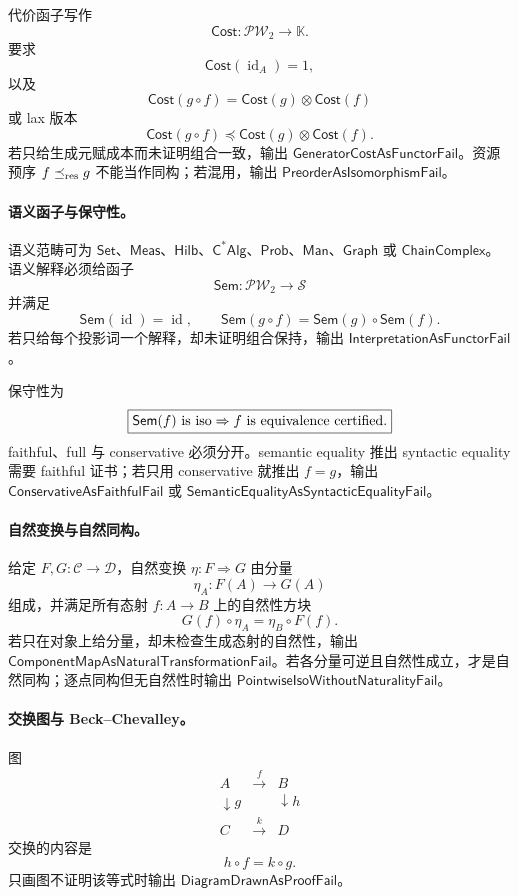 代价函子写作
\[
\boxed{
\mathsf{Cost}:\mathcal{PW}_2\to\mathbb K.
}
\]
要求
\[
\mathsf{Cost}(\operatorname{id}_A)=1,
\]
以及
\[
\mathsf{Cost}(g\circ f)=\mathsf{Cost}(g)\otimes\mathsf{Cost}(f)
\]
或 lax 版本
\[
\mathsf{Cost}(g\circ f)\preceq
\mathsf{Cost}(g)\otimes\mathsf{Cost}(f).
\]
若只给生成元赋成本而未证明组合一致，输出 \(\mathsf{GeneratorCostAsFunctorFail}\)。资源预序 \(f\preceq_{\rm res}g\) 不能当作同构；若混用，输出 \(\mathsf{PreorderAsIsomorphismFail}\)。

\paragraph{语义函子与保守性。}
语义范畴可为 \(\mathsf{Set}\)、\(\mathsf{Meas}\)、\(\mathsf{Hilb}\)、\(\mathsf{C^*Alg}\)、\(\mathsf{Prob}\)、\(\mathsf{Man}\)、\(\mathsf{Graph}\) 或 \(\mathsf{ChainComplex}\)。语义解释必须给函子
\[
\boxed{
\mathsf{Sem}:\mathcal{PW}_2\to\mathcal S
}
\]
并满足
\[
\mathsf{Sem}(\operatorname{id})=\operatorname{id},
\qquad
\mathsf{Sem}(g\circ f)=\mathsf{Sem}(g)\circ\mathsf{Sem}(f).
\]
若只给每个投影词一个解释，却未证明组合保持，输出 \(\mathsf{InterpretationAsFunctorFail}\)。

保守性为
\[
\boxed{
\mathsf{Sem}(f)\ {\rm is\ iso}
\Rightarrow
f\ {\rm is\ equivalence\ certified}.
}
\]
faithful、full 与 conservative 必须分开。semantic equality 推出 syntactic equality 需要 faithful 证书；若只用 conservative 就推出 \(f=g\)，输出 \(\mathsf{ConservativeAsFaithfulFail}\) 或 \(\mathsf{SemanticEqualityAsSyntacticEqualityFail}\)。

\paragraph{自然变换与自然同构。}
给定 \(F,G:\mathcal C\to\mathcal D\)，自然变换 \(\eta:F\Rightarrow G\) 由分量
\[
\eta_A:F(A)\to G(A)
\]
组成，并满足所有态射 \(f:A\to B\) 上的自然性方块
\[
\boxed{
G(f)\circ\eta_A=\eta_B\circ F(f).
}
\]
若只在对象上给分量，却未检查生成态射的自然性，输出 \(\mathsf{ComponentMapAsNaturalTransformationFail}\)。若各分量可逆且自然性成立，才是自然同构；逐点同构但无自然性时输出 \(\mathsf{PointwiseIsoWithoutNaturalityFail}\)。

\paragraph{交换图与 Beck--Chevalley。}
图
\[
\begin{array}{ccc}
A & \xrightarrow{f} & B\\
\downarrow g & & \downarrow h\\
C & \xrightarrow{k} & D
\end{array}
\]
交换的内容是
\[
\boxed{
h\circ f=k\circ g.
}
\]
只画图不证明该等式时输出 \(\mathsf{DiagramDrawnAsProofFail}\)。

